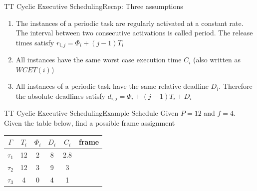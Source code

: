 \begin{frame}{TT Cyclic Executive Scheduling}{Recap: Three assumptions}
\begin{enumerate}
    \item The instances of a periodic task are regularly activated at a constant rate. The interval between two consecutive activations is called period. The release times satisfy $r_{i,j} = \Phi_i + (j-1)T_i$
    \item All instances have the same worst case execution time $C_i$ (also written as $WCET(i)$)
    \item All instances of a periodic task have the same relative deadline $D_i$. Therefore the absolute deadlines satisfy $d_{i,j} = \Phi_i + (j-1)T_i + D_i$
\end{enumerate}
\end{frame}

\begin{frame}{TT Cyclic Executive Scheduling}{Example Schedule}
Given $P = 12$ and $f = 4$. Given the table below, find a possible frame assignment
\begin{center}
    \begin{tabular}{|c||c|c|c|c|c|}
    \hline
    $\Gamma$ & $T_i$ & $\Phi_i$ & $D_i$ & $C_i$ & frame\\
    \hline
    $\tau_1$ & 12 & 2 & 8 & 2.8 & \\
    \hline
    $\tau_2$ & 12 & 3 & 9 & 3 &\\
    \hline
    $\tau_3$ & 4 & 0 & 4 & 1 &\\
    \hline
\end{tabular}
\end{center}
\end{frame}

